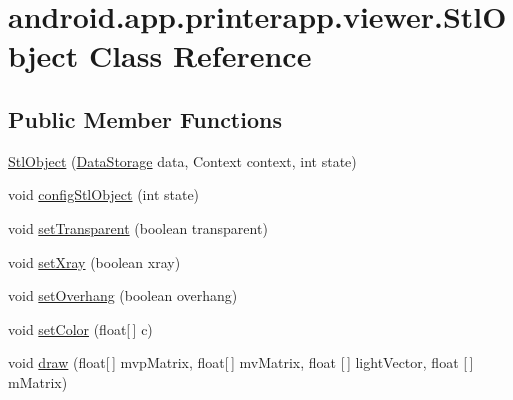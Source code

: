 \hypertarget{classandroid_1_1app_1_1printerapp_1_1viewer_1_1_stl_object}{}\section{android.\+app.\+printerapp.\+viewer.\+Stl\+Object Class Reference}
\label{classandroid_1_1app_1_1printerapp_1_1viewer_1_1_stl_object}
\subsection*{Public Member Functions}
\begin{DoxyCompactItemize}
\item 
\hyperlink{classandroid_1_1app_1_1printerapp_1_1viewer_1_1_stl_object_a81effd21a9cab97912683917b4746bc8}{Stl\+Object} (\hyperlink{classandroid_1_1app_1_1printerapp_1_1viewer_1_1_data_storage}{Data\+Storage} data, Context context, int state)
\item 
void \hyperlink{classandroid_1_1app_1_1printerapp_1_1viewer_1_1_stl_object_a828124a29a0b380bb388b8ef7fa17830}{config\+Stl\+Object} (int state)
\item 
void \hyperlink{classandroid_1_1app_1_1printerapp_1_1viewer_1_1_stl_object_ad476d322693704b0b14a4eb7bb480721}{set\+Transparent} (boolean transparent)
\item 
void \hyperlink{classandroid_1_1app_1_1printerapp_1_1viewer_1_1_stl_object_a9613ac50085ad2e9cd8ff8c2a7076fe2}{set\+Xray} (boolean xray)
\item 
void \hyperlink{classandroid_1_1app_1_1printerapp_1_1viewer_1_1_stl_object_a9b6d4712a8d9bb7b8b78baf523833978}{set\+Overhang} (boolean overhang)
\item 
void \hyperlink{classandroid_1_1app_1_1printerapp_1_1viewer_1_1_stl_object_ac6f9b9217d7866f396cd26ef3b155c78}{set\+Color} (float\mbox{[}$\,$\mbox{]} c)
\item 
void \hyperlink{classandroid_1_1app_1_1printerapp_1_1viewer_1_1_stl_object_a1da964e8764949faa9f34a9b02dd9aa0}{draw} (float\mbox{[}$\,$\mbox{]} mvp\+Matrix, float\mbox{[}$\,$\mbox{]} mv\+Matrix, float \mbox{[}$\,$\mbox{]} light\+Vector, float \mbox{[}$\,$\mbox{]} m\+Matrix)
\end{DoxyCompactItemize}
